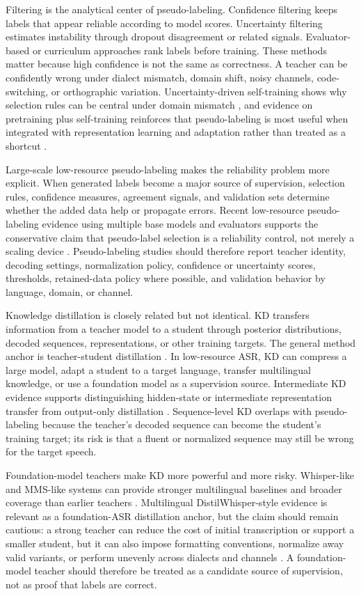 \documentclass[pdflatex,sn-basic]{sn-jnl}
\theoremstyle{thmstyleone}
\theoremstyle{thmstyletwo}
\theoremstyle{thmstylethree}
\begin{document}
Filtering is the analytical center of pseudo-labeling. Confidence filtering keeps labels that appear reliable according to model scores. Uncertainty filtering estimates instability through dropout disagreement or related signals. Evaluator-based or curriculum approaches rank labels before training. These methods matter because high confidence is not the same as correctness. A teacher can be confidently wrong under dialect mismatch, domain shift, noisy channels, code-switching, or orthographic variation. Uncertainty-driven self-training shows why selection rules can be central under domain mismatch \citep{khurana2020dust}, and evidence on pretraining plus self-training reinforces that pseudo-labeling is most useful when integrated with representation learning and adaptation rather than treated as a shortcut \citep{xu2020selftraining}.

Large-scale low-resource pseudo-labeling makes the reliability problem more explicit. When generated labels become a major source of supervision, selection rules, confidence measures, agreement signals, and validation sets determine whether the added data help or propagate errors. Recent low-resource pseudo-labeling evidence using multiple base models and evaluators supports the conservative claim that pseudo-label selection is a reliability control, not merely a scaling device \citep{bhogale24_interspeech}. Pseudo-labeling studies should therefore report teacher identity, decoding settings, normalization policy, confidence or uncertainty scores, thresholds, retained-data policy where possible, and validation behavior by language, domain, or channel.

Knowledge distillation is closely related but not identical. KD transfers information from a teacher model to a student through posterior distributions, decoded sequences, representations, or other training targets. The general method anchor is teacher-student distillation \citep{hinton2015distilling}. In low-resource ASR, KD can compress a large model, adapt a student to a target language, transfer multilingual knowledge, or use a foundation model as a supervision source. Intermediate KD evidence supports distinguishing hidden-state or intermediate representation transfer from output-only distillation \citep{yoon2022interkd}. Sequence-level KD overlaps with pseudo-labeling because the teacher's decoded sequence can become the student's training target; its risk is that a fluent or normalized sequence may still be wrong for the target speech.

Foundation-model teachers make KD more powerful and more risky. Whisper-like and MMS-like systems can provide stronger multilingual baselines and broader coverage than earlier teachers \citep{pmlr-v202-radford23a,pratap2024mms}. Multilingual DistilWhisper-style evidence is relevant as a foundation-ASR distillation anchor, but the claim should remain cautious: a strong teacher can reduce the cost of initial transcription or support a smaller student, but it can also impose formatting conventions, normalize away valid variants, or perform unevenly across dialects and channels \citep{ferraz2023multilingualdistilwhisper}. A foundation-model teacher should therefore be treated as a candidate source of supervision, not as proof that labels are correct.
\end{document}
